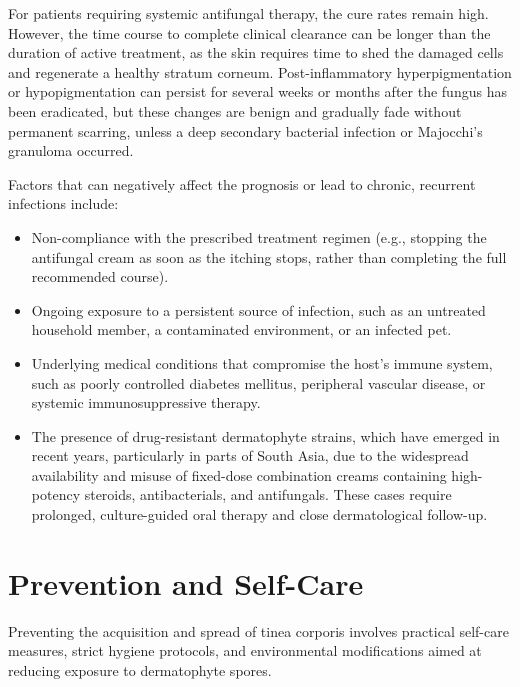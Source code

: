 For patients requiring systemic antifungal therapy, the cure rates remain high. However, the time course to complete clinical clearance can be longer than the duration of active treatment, as the skin requires time to shed the damaged cells and regenerate a healthy stratum corneum. Post-inflammatory hyperpigmentation or hypopigmentation can persist for several weeks or months after the fungus has been eradicated, but these changes are benign and gradually fade without permanent scarring, unless a deep secondary bacterial infection or Majocchi's granuloma occurred.

Factors that can negatively affect the prognosis or lead to chronic, recurrent infections include:
\begin{itemize}
    \item Non-compliance with the prescribed treatment regimen (e.g., stopping the antifungal cream as soon as the itching stops, rather than completing the full recommended course).
    \item Ongoing exposure to a persistent source of infection, such as an untreated household member, a contaminated environment, or an infected pet.
    \item Underlying medical conditions that compromise the host's immune system, such as poorly controlled diabetes mellitus, peripheral vascular disease, or systemic immunosuppressive therapy.
    \item The presence of drug-resistant dermatophyte strains, which have emerged in recent years, particularly in parts of South Asia, due to the widespread availability and misuse of fixed-dose combination creams containing high-potency steroids, antibacterials, and antifungals. These cases require prolonged, culture-guided oral therapy and close dermatological follow-up.
\end{itemize}

\section*{Prevention and Self-Care}
Preventing the acquisition and spread of tinea corporis involves practical self-care measures, strict hygiene protocols, and environmental modifications aimed at reducing exposure to dermatophyte spores.

